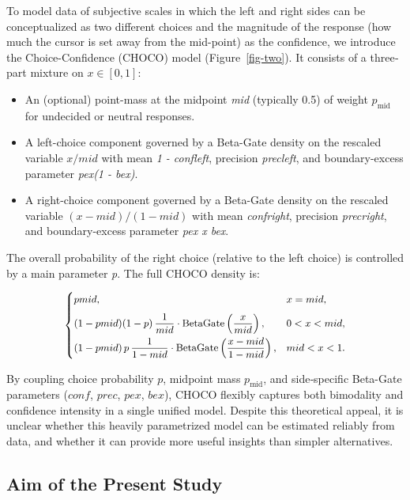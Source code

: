 \documentclass[
  jou,
  floatsintext,
  longtable,
  nolmodern,
  notxfonts,
  notimes,
  colorlinks=true,linkcolor=blue,citecolor=blue,urlcolor=blue]{apa7}
\providecommand{\tightlist}{%
  \setlength{\itemsep}{0pt}\setlength{\parskip}{0pt}}
\begin{document}
To model data of subjective scales in which the left and right sides can
be conceptualized as two different choices and the magnitude of the
response (how much the cursor is set away from the mid-point) as the
confidence, we introduce the Choice-Confidence (CHOCO) model
(Figure~\ref{fig-two}). It consists of a three‐part mixture on
\(x \in [0, 1]\):

\begin{itemize}
\tightlist
\item
  An (optional) point-mass at the midpoint \emph{mid} (typically 0.5) of
  weight \(p_{\text{mid}}\) for undecided or neutral responses.\\
\item
  A left-choice component governed by a Beta-Gate density on the
  rescaled variable \(x/mid\) with mean \emph{1 - confleft}, precision
  \emph{precleft}, and boundary-excess parameter \emph{pex(1 - bex)}.\\
\item
  A right-choice component governed by a Beta-Gate density on the
  rescaled variable \((x - mid)/(1 - mid)\) with mean \emph{confright},
  precision \emph{precright}, and boundary-excess parameter \emph{pex x
  bex}.
\end{itemize}

The overall probability of the right choice (relative to the left
choice) is controlled by a main parameter \emph{p}. The full CHOCO
density is:

\[
\small
\begin{cases}
pmid, & x = mid, \\[6pt]
(1 - pmid)(1 - p)\,\dfrac{1}{mid} \cdot \mathrm{BetaGate}\left(\dfrac{x}{mid}\right), & 0 < x < mid, \\[6pt]
(1 - pmid)\,p\,\dfrac{1}{1 - mid} \cdot \mathrm{BetaGate}\left(\dfrac{x - mid}{1 - mid}\right), & mid < x < 1. \\
\end{cases}
\]

By coupling choice probability \(p\), midpoint mass \(p_{\text{mid}}\),
and side‐specific Beta-Gate parameters (\(conf\), \(prec\), \(pex\),
\(bex\)), CHOCO flexibly captures both bimodality and confidence
intensity in a single unified model. Despite this theoretical appeal, it
is unclear whether this heavily parametrized model can be estimated
reliably from data, and whether it can provide more useful insights than
simpler alternatives.

\subsection{Aim of the Present Study}\label{aim-of-the-present-study}
\end{document}

